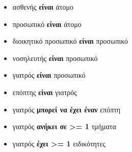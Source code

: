 \documentclass[13pt]{article}
\begin{document}
\begin{itemize}
\tightlist
\item
    ασθενής \textbf{είναι} άτομο
\item
    προσωπικό \textbf{είναι} άτομο
\item
    διοικητικό προσωπικό \textbf{είναι} προσωπικό
\item
    νοσηλευτής \textbf{είναι} προσωπικό
\item
  γιατρός \textbf{είναι} προσωπικό
\item
  επόπτης \textbf{είναι} γιατρός
\item
  γιατρός \textbf{μπορεί να έχει έναν} επόπτη
\item
  γιατρός \textbf{ανήκει σε \textgreater= 1} τμήματα
\item
    γιατρός \textbf{έχει \textgreater= 1} ειδικότητες


\end{itemize}
\end{document}
